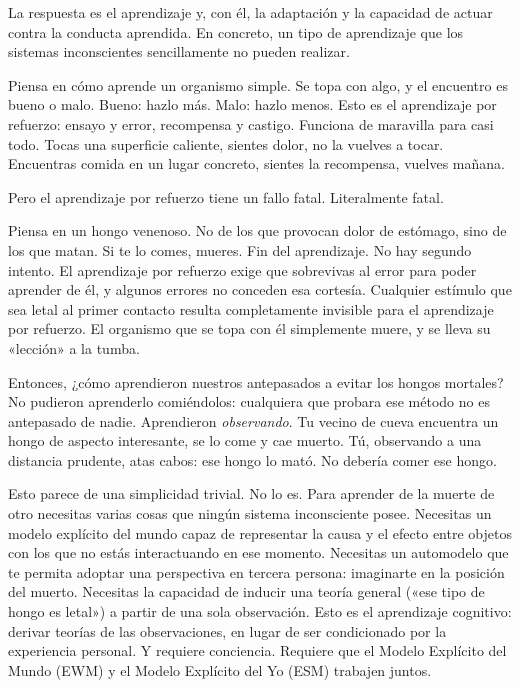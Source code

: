 \documentclass[11pt, twoside, openright]{book}
\begin{document}
La respuesta es el aprendizaje y, con él, la adaptación y la capacidad de actuar contra la conducta aprendida. En concreto, un tipo de aprendizaje que los sistemas inconscientes sencillamente no pueden realizar.

Piensa en cómo aprende un organismo simple. Se topa con algo, y el encuentro es bueno o malo. Bueno: hazlo más. Malo: hazlo menos. Esto es el aprendizaje por refuerzo: ensayo y error, recompensa y castigo. Funciona de maravilla para casi todo. Tocas una superficie caliente, sientes dolor, no la vuelves a tocar. Encuentras comida en un lugar concreto, sientes la recompensa, vuelves mañana.

Pero el aprendizaje por refuerzo tiene un fallo fatal. Literalmente fatal.

Piensa en un hongo venenoso. No de los que provocan dolor de estómago, sino de los que matan. Si te lo comes, mueres. Fin del aprendizaje. No hay segundo intento. El aprendizaje por refuerzo exige que sobrevivas al error para poder aprender de él, y algunos errores no conceden esa cortesía. Cualquier estímulo que sea letal al primer contacto resulta completamente invisible para el aprendizaje por refuerzo. El organismo que se topa con él simplemente muere, y se lleva su «lección» a la tumba.

Entonces, ¿cómo aprendieron nuestros antepasados a evitar los hongos mortales? No pudieron aprenderlo comiéndolos: cualquiera que probara ese método no es antepasado de nadie. Aprendieron \textit{observando}. Tu vecino de cueva encuentra un hongo de aspecto interesante, se lo come y cae muerto. Tú, observando a una distancia prudente, atas cabos: ese hongo lo mató. No debería comer ese hongo.

Esto parece de una simplicidad trivial. No lo es. Para aprender de la muerte de otro necesitas varias cosas que ningún sistema inconsciente posee. Necesitas un modelo explícito del mundo capaz de representar la causa y el efecto entre objetos con los que no estás interactuando en ese momento. Necesitas un automodelo que te permita adoptar una perspectiva en tercera persona: imaginarte en la posición del muerto. Necesitas la capacidad de inducir una teoría general («ese tipo de hongo es letal») a partir de una sola observación. Esto es el aprendizaje cognitivo: derivar teorías de las observaciones, en lugar de ser condicionado por la experiencia personal. Y requiere conciencia. Requiere que el Modelo Explícito del Mundo (EWM) y el Modelo Explícito del Yo (ESM) trabajen juntos.
\end{document}
